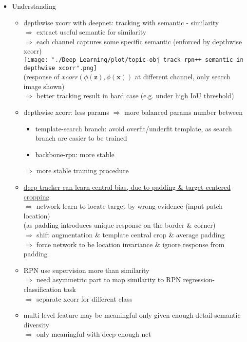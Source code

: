 \begin{itemize}
\begin{itemize}
	\item Understanding
		\begin{itemize}
		\item depthwise xcorr with deepnet: tracking with semantic - similarity \\
		$\Rightarrow$ extract useful semantic for similarity \\
		$\Rightarrow$ each channel captures some specific semantic (enforced by depthwise xcorr) \\
		\texttt{[image: "./Deep Learning/plot/topic-obj track rpn++ semantic in depthwise xcorr".png]} \\
		(response of $xcorr(\phi(\mathbf z), \phi(\mathbf x))$ at different channel, only search image shown) \\
		$\Rightarrow$ better tracking result in \underline{hard case} (e.g. under high IoU threshold)
		\item depthwise xcorr: less params $\Rightarrow$ more balanced params number between
			\begin{itemize}
			\item template-search branch: avoid overfit/underfit template, as search branch are easier to be trained
			\item backbone-rpn: more stable
			\end{itemize}
		$\Rightarrow$ more stable training procedure
		\item \underline{deep tracker can learn central bias, due to padding \& target-centered cropping} \\
		$\Rightarrow$ network learn to locate target by wrong evidence (input patch location) \\ 
		(as padding introduces unique response on the border \& corner) \\
		$\Rightarrow$ shift augmentation \& template central crop \& average padding \\
		$\Rightarrow$ force network to be location invariance \& ignore response from padding
		\item RPN use supervision more than similarity \\ 
		$\Rightarrow$ need asymmetric part to map similarity to RPN regression-classification task \\
		$\Rightarrow$ separate xcorr for different class
		\item multi-level feature may be meaningful only given enough detail-semantic diversity \\
		$\Rightarrow$ only meaningful with deep-enough net
		\end{itemize}
	\end{itemize}


\end{itemize}
